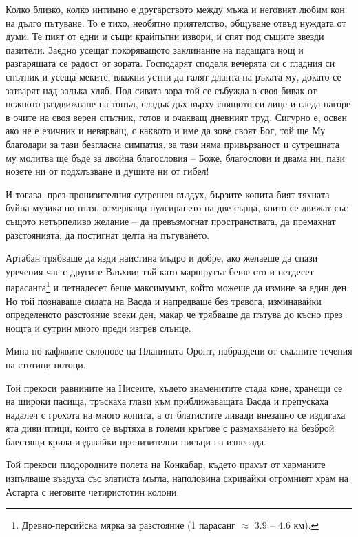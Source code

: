 \documentclass[oneside,10pt]{memoir}
\begin{document}
Колко близко, колко интимно е другарството между мъжа и неговият любим кон на
дълго пътуване. То е тихо, необятно приятелство, общуване отвъд нуждата от думи.
Те пият от едни и същи крайпътни извори, и спят под същите звезди пазители.
Заедно усещат покоряващото заклинание на падащата нощ и разгарящата се радост от
зората. Господарят споделя вечерята си с гладния си спътник и усеща меките,
влажни устни да галят дланта на ръката му, докато се затварят над залъка хляб.
Под сивата зора той се събужда в своя бивак от нежното раздвижване на топъл,
сладък дъх върху спящото си лице и гледа нагоре в очите на своя верен спътник,
готов и очакващ дневният труд. Сигурно е, освен ако не е езичник и невярващ, с
каквото и име да зове своят Бог, той ще Му благодари за тази безгласна симпатия,
за тази няма привързаност и сутрешната му молитва ще бъде за двойна благословия
-- Боже, благослови и двама ни, пази нозете ни от подхлъзване и душите ни от
гибел!

И тогава, през пронизителния сутрешен въздух, бързите копита бият тяхната буйна
музика по пътя, отмерваща пулсирането на две сърца, които се движат със същото
нетърпеливо желание -- да превъзмогнат пространствата, да премахнат
разстоянията, да постигнат целта на пътуването.

Артабан трябваше да язди наистина мъдро и добре, ако желаеше да спази уречения
час с другите Влъхви; тъй като маршрутът беше сто и петдесет
парасанга\footnote{Древно-персийска мярка за разстояние (1 парасанг $\approx$
3.9 -- 4.6 км).} и петнадесет беше максимумът, който можеше да измине за един
ден. Но той познаваше силата на Васда и напредваше без тревога, изминавайки
определеното разстояние всеки ден, макар че трябваше да пътува до късно през
нощта и сутрин много преди изгрев слънце.

Мина по кафявите склонове на Планината Оронт, набраздени от скалните течения
на стотици потоци.

Той прекоси равнините на Нисеите, където знаменитите стада коне, хранещи се на
широки пасища, тръскаха глави към приближаващата Васда и препускаха надалеч с
грохота на много копита, а от блатистите ливади внезапно се издигаха ята диви
птици, които се въртяха в големи кръгове с размахването на безброй блестящи
крила издавайки пронизителни писъци на изненада.

Той прекоси плодородните полета на Конкабар, където прахът от харманите
изпълваше въздуха със златиста мъгла, наполовина скривайки огромният храм на
Астарта с неговите четиристотин колони.
\end{document}

